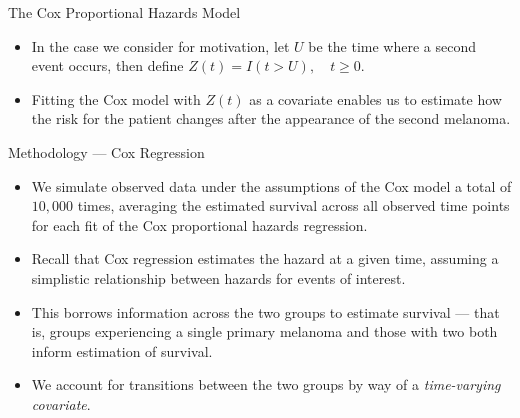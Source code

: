 \documentclass[12pt,t,handout]{beamer}
\begin{document}

\begin{frame}[c]{The Cox Proportional Hazards Model}

\begin{center}
\begin{itemize}
  \itemsep12pt
  \item In the case we consider for motivation, let $U$ be the time where a
    second event occurs, then define $Z(t) = I(t > U), \quad t\geq 0.$
  \item Fitting the Cox model with $Z(t)$ as a covariate enables us to estimate
    how the risk for the patient changes after the appearance of the second
    melanoma.
\end{itemize}
\end{center}


\end{frame}


\begin{frame}[c]{Methodology --- Cox Regression}

\begin{center}
\begin{itemize}
  \itemsep12pt
  \item We simulate observed data under the assumptions of the Cox model a total
    of $10,000$ times, averaging the estimated survival across all observed time
    points for each fit of the Cox proportional hazards regression.
  \item Recall that Cox regression estimates the hazard at a given time,
    assuming a simplistic relationship between hazards for events of interest.
  \item This borrows information across the two groups to estimate survival ---
    that is, groups experiencing a single primary melanoma and those with two
    both inform estimation of survival.
  \item We account for transitions between the two groups by way of a
    \textit{time-varying covariate}.
\end{itemize}
\end{center}

\note{
}

\end{frame}
\end{document}
